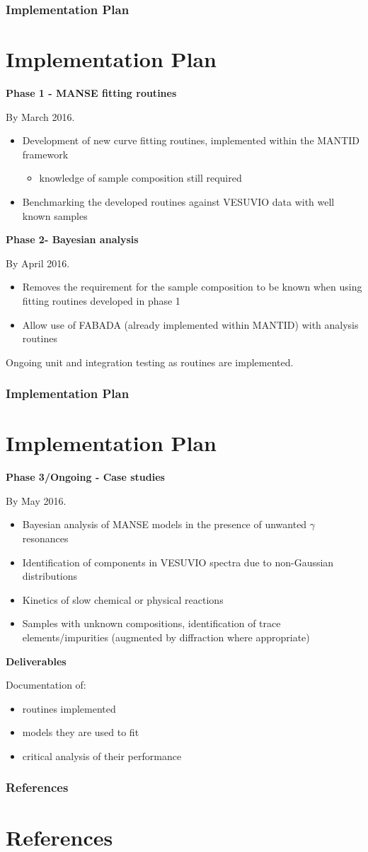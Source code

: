 \documentclass[10pt,serif,t]{beamer}
\newcommand\Heading[1]{%
  {\bfseries#1}\par\smallskip}
\newenvironment{Slide}[1]
{
\begin{frame}[fragile,environment=Slide]
  \frametitle{#1}
  \section{#1}
}
{
\end{frame}
}
\begin{document}
\begin{Slide}{Implementation Plan}
  \Heading{Phase 1 - MANSE fitting routines}
  By March 2016.
  \smallskip
  \begin{itemize}
    \item Development of new curve fitting routines, implemented within the MANTID framework
      \begin{itemize}
        \item knowledge of sample composition still required
      \end{itemize}
    \item Benchmarking the developed routines against VESUVIO data with well
          known samples
  \end{itemize}

  \par\bigskip
  \Heading{Phase 2- Bayesian analysis}
  By April 2016.
  \smallskip
  \begin{itemize}
    \item Removes the requirement for the sample composition to be known when
          using fitting routines developed in phase 1
    \item Allow use of FABADA \cite{fabada} (already implemented within MANTID)
          with analysis routines
  \end{itemize}

  \par\bigskip
  Ongoing unit and integration testing as routines are implemented.
\end{Slide}

\begin{Slide}{Implementation Plan}
  \Heading{Phase 3/Ongoing - Case studies}
  By May 2016.
  \smallskip
  \begin{itemize}
    \item Bayesian analysis of MANSE models in the presence of unwanted $\gamma$
          resonances
    \item Identification of components in VESUVIO spectra due to
          non-Gaussian distributions
    \item Kinetics of slow chemical or physical reactions
    \item Samples with unknown compositions, identification of trace
          elements/impurities (augmented by diffraction where appropriate)
  \end{itemize}

  \par\bigskip
  \Heading{Deliverables}
  Documentation of:
  \begin{itemize}
    \item routines implemented
    \item models they are used to fit
    \item critical analysis of their performance
  \end{itemize}
\end{Slide}

\begin{Slide}{References}
  \nocite{vesuvio_evs_mayers2012}
  \printbibliography
\end{Slide}
\end{document}
